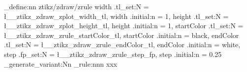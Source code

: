 \keys_define:nn { ztikz/zdraw/zrule }{
  width         .tl_set:N   = \l__ztikz_zdraw_zplot_width_tl,
  width         .initial:n  = {1},
  height        .tl_set:N   = \l__ztikz_zdraw_zplot_height_tl,
  height        .initial:n  = {1},
  startColor    .tl_set:N   = \l__ztikz_zdraw_zrule_startColor_tl,
  startColor    .initial:n  = {black},
  endColor      .tl_set:N   = \l__ztikz_zdraw_zrule_endColor_tl,
  endColor      .initial:n  = {white},
  step          .fp_set:N   = \l__ztikz_zdraw_zrule_step_fp,
  step          .initial:n  = {0.25}
}
\cs_generate_variant:Nn \gradient_rule:nnn {xxx}
\NewDocumentCommand{}